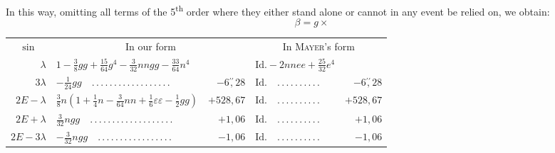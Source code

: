 \par\noindent\hspace*{\parindent}In this way, omitting all terms of the 5\textsuperscript{th}
order where they either stand alone or cannot in any event be relied on,
we obtain:
\[
\beta=g\times
\]
\begin{landscape}
\begingroup\small
\setlength{\LTpre}{0pt}\setlength{\LTpost}{0pt}
\setlength{\tabcolsep}{3pt}
\renewcommand{\arraystretch}{1.10}
\begin{longtable}{r|p{7.8cm}r@{\quad}p{4.3cm}r}
\multicolumn{1}{c}{\(\sin\)}&\multicolumn{2}{c}{In our form}&
\multicolumn{2}{c}{In \textsc{Mayer}'s form}\\
\(\lambda\)&\(1-\tfrac38gg+\tfrac{15}{64}g^4-\tfrac{3}{32}nngg-\tfrac{33}{64}n^4\)&
&\(\text{Id.}-2nnee+\tfrac{25}{32}e^4\)&\\
\(3\lambda\)&\(-\tfrac{1}{24}gg\quad \mathord{.}\,\mathord{.}\,\mathord{.}\,\mathord{.}\,\mathord{.}\,\mathord{.}\,\mathord{.}\,\mathord{.}\,\mathord{.}\,\mathord{.}\,\mathord{.}\,\mathord{.}\,\mathord{.}\,\mathord{.}\,\mathord{.}\,\mathord{.}\,\mathord{.}\,\mathord{.}\)&\(-6\overset{\prime\prime}{,}28\)
&\(\text{Id.}\quad \mathord{.}\,\mathord{.}\,\mathord{.}\,\mathord{.}\,\mathord{.}\,\mathord{.}\,\mathord{.}\,\mathord{.}\,\mathord{.}\,\mathord{.}\)&\(-6\overset{\prime\prime}{,}28\)\\
\(2E-\lambda\)&\(\tfrac38n(1+\tfrac14n-\tfrac{3}{64}nn+\tfrac16\varepsilon\varepsilon-\tfrac12gg)\)&\(+528{,}67\)
&\(\text{Id.}\quad \mathord{.}\,\mathord{.}\,\mathord{.}\,\mathord{.}\,\mathord{.}\,\mathord{.}\,\mathord{.}\,\mathord{.}\,\mathord{.}\,\mathord{.}\)&\(+528{,}67\)\\
\(2E+\lambda\)&\(\tfrac{3}{32}ngg\quad \mathord{.}\,\mathord{.}\,\mathord{.}\,\mathord{.}\,\mathord{.}\,\mathord{.}\,\mathord{.}\,\mathord{.}\,\mathord{.}\,\mathord{.}\,\mathord{.}\,\mathord{.}\,\mathord{.}\,\mathord{.}\,\mathord{.}\,\mathord{.}\,\mathord{.}\,\mathord{.}\,\mathord{.}\)&\(+1{,}06\)
&\(\text{Id.}\quad \mathord{.}\,\mathord{.}\,\mathord{.}\,\mathord{.}\,\mathord{.}\,\mathord{.}\,\mathord{.}\,\mathord{.}\,\mathord{.}\,\mathord{.}\)&\(+1{,}06\)\\
\(2E-3\lambda\)&\(-\tfrac{3}{32}ngg\quad \mathord{.}\,\mathord{.}\,\mathord{.}\,\mathord{.}\,\mathord{.}\,\mathord{.}\,\mathord{.}\,\mathord{.}\,\mathord{.}\,\mathord{.}\,\mathord{.}\,\mathord{.}\,\mathord{.}\,\mathord{.}\,\mathord{.}\,\mathord{.}\,\mathord{.}\)&\(-1{,}06\)
&\(\text{Id.}\quad \mathord{.}\,\mathord{.}\,\mathord{.}\,\mathord{.}\,\mathord{.}\,\mathord{.}\,\mathord{.}\,\mathord{.}\,\mathord{.}\,\mathord{.}\)&\(-1{,}06\)\\

\end{longtable}
\end{landscape}
